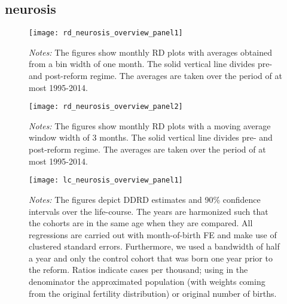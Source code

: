 \subsection{neurosis}
\begin{landscape}
\begin{figure}[H]
	\centering
	\begin{minipage}{.95\linewidth}
	\texttt{[image: rd\_neurosis\_overview\_panel1]}
	{\scriptsize \emph{Notes:} The figures show monthly RD plots with averages obtained from a bin width of one month. The solid vertical line divides pre- and post-reform regime. The averages are taken over the period of at most 1995-2014. \par}
\end{minipage}
\end{figure}
\end{landscape}
\begin{landscape}
\begin{figure}[H]
	\centering
\begin{minipage}{.95\linewidth}
	\texttt{[image: rd\_neurosis\_overview\_panel2]}
	{\scriptsize \emph{Notes:} The figures show monthly RD plots with a moving average window width of 3 months. The solid vertical line divides pre- and post-reform regime. The averages are taken over the period of at most 1995-2014. \par}
\end{minipage}
\end{figure}
\end{landscape}


\begin{landscape}
\begin{figure}[H]
\centering
\begin{minipage}{.9\linewidth}
\texttt{[image: lc\_neurosis\_overview\_panel1]}
{\scriptsize \emph{Notes:} The figures depict DDRD estimates and 90\% confidence intervals over the life-course. The years are harmonized such that the cohorts are in the same age when they are compared. All regressions are carried out with month-of-birth FE and make use of clustered standard errors. Furthermore, we used a bandwidth of half a year and only the control cohort that was born one year prior to the reform. Ratios indicate cases per thousand; using in the denominator the approximated population (with weights coming from the original fertility distribution) or original number of births. \par}
\end{minipage}
\end{figure}
\end{landscape}
